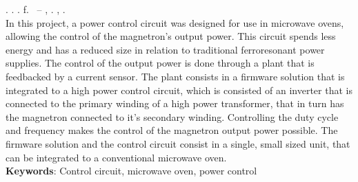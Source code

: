 
\begin{resumo}[ABSTRACT]
\begin{SingleSpacing}

\imprimirautorcitacao. \imprimirtitleabstract. \imprimirdata. \pageref {LastPage} f. \imprimirprojeto\ – \imprimirprograma, \imprimirinstituicao. \imprimirlocal, \imprimirdata.\\


In this project, a power control circuit was designed for use in microwave ovens, allowing the control of the magnetron's output power. This circuit spends less energy and has a reduced size in relation to traditional ferroresonant power supplies. The control of the output power is done through a plant that is feedbacked by a current sensor. The plant consists in a firmware solution that is integrated to a high power control circuit, which is consisted of an inverter that is connected to the primary winding of a high power transformer, that in turn has the magnetron connected to it’s secondary winding. Controlling the duty cycle and frequency makes the control of the magnetron output power possible. The firmware solution and the control circuit consist in a single, small sized unit, that can be integrated to a conventional microwave oven.\\


\textbf{Keywords}: Control circuit, microwave oven, power control 

\end{SingleSpacing}
\end{resumo}

